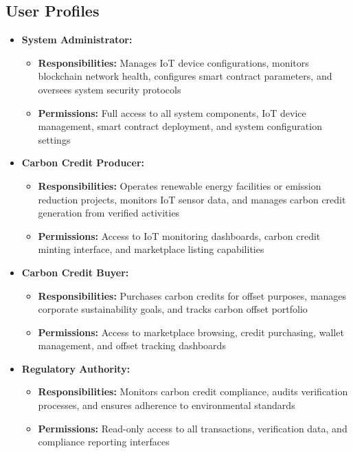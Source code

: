 \documentclass[oneside,a4paper,12pt]{book}
\begin{document}
\subsection{User Profiles}

\begin{itemize}
    \item \textbf{System Administrator:} 
    \begin{itemize}
        \item \textbf{Responsibilities:} Manages IoT device configurations, monitors blockchain network health, configures smart contract parameters, and oversees system security protocols
        \item \textbf{Permissions:} Full access to all system components, IoT device management, smart contract deployment, and system configuration settings
    \end{itemize}

    \item \textbf{Carbon Credit Producer:} 
    \begin{itemize}
        \item \textbf{Responsibilities:} Operates renewable energy facilities or emission reduction projects, monitors IoT sensor data, and manages carbon credit generation from verified activities
        \item \textbf{Permissions:} Access to IoT monitoring dashboards, carbon credit minting interface, and marketplace listing capabilities
    \end{itemize}

    \item \textbf{Carbon Credit Buyer:} 
    \begin{itemize}
        \item \textbf{Responsibilities:} Purchases carbon credits for offset purposes, manages corporate sustainability goals, and tracks carbon offset portfolio
        \item \textbf{Permissions:} Access to marketplace browsing, credit purchasing, wallet management, and offset tracking dashboards
    \end{itemize}

    \item \textbf{Regulatory Authority:} 
    \begin{itemize}
        \item \textbf{Responsibilities:} Monitors carbon credit compliance, audits verification processes, and ensures adherence to environmental standards
        \item \textbf{Permissions:} Read-only access to all transactions, verification data, and compliance reporting interfaces
    \end{itemize}
\end{itemize}
\end{document}
